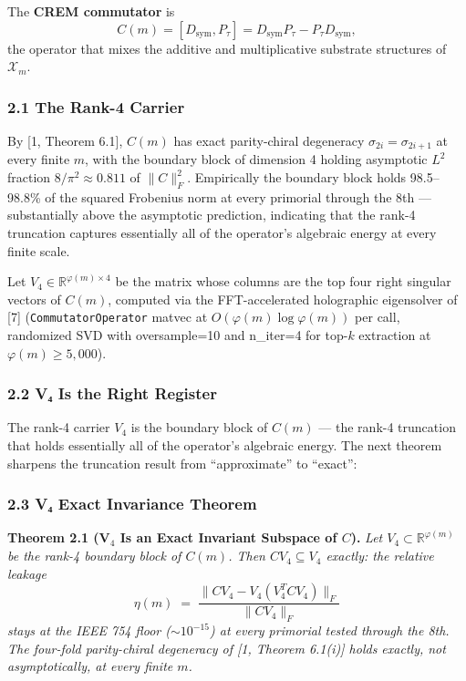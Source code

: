 \documentclass[
]{article}
\begin{document}
The \textbf{CREM commutator} is
\[C(m) = [D_\text{sym}, P_\tau] = D_\text{sym} P_\tau - P_\tau D_\text{sym}, \tag{2.1}\]
the operator that mixes the additive and multiplicative substrate
structures of \(\mathcal{X}_m\).

\subsubsection{2.1 The Rank-4 Carrier}\label{the-rank-4-carrier}

By {[}1, Theorem 6.1{]}, \(C(m)\) has exact parity-chiral degeneracy
\(\sigma_{2i} = \sigma_{2i+1}\) at every finite \(m\), with the boundary
block of dimension 4 holding asymptotic \(L^2\) fraction
\(8/\pi^2 \approx 0.811\) of \(\|C\|_F^2\). Empirically the boundary
block holds 98.5--98.8\% of the squared Frobenius norm at every
primorial through the 8th --- substantially above the asymptotic
prediction, indicating that the rank-4 truncation captures essentially
all of the operator's algebraic energy at every finite scale.

Let \(V_4 \in \mathbb{R}^{\varphi(m) \times 4}\) be the matrix whose
columns are the top four right singular vectors of \(C(m)\), computed
via the FFT-accelerated holographic eigensolver of {[}7{]}
(\texttt{CommutatorOperator} matvec at \(O(\varphi(m) \log \varphi(m))\)
per call, randomized SVD with oversample=10 and n\_iter=4 for top-\(k\)
extraction at \(\varphi(m) \geq 5{,}000\)).

\subsubsection{2.2 V₄ Is the Right
Register}\label{vux2084-is-the-right-register}

The rank-4 carrier \(V_4\) is the boundary block of \(C(m)\) --- the
rank-4 truncation that holds essentially all of the operator's algebraic
energy. The next theorem sharpens the truncation result from
``approximate'' to ``exact'':

\subsubsection{2.3 V₄ Exact Invariance
Theorem}\label{vux2084-exact-invariance-theorem}

\textbf{Theorem 2.1 (V\(_4\) Is an Exact Invariant Subspace of \(C\)).}
\emph{Let \(V_4 \subset \mathbb{R}^{\varphi(m)}\) be the rank-4 boundary
block of \(C(m)\). Then \(C V_4 \subseteq V_4\) exactly: the relative
leakage}
\[\eta(m) \;=\; \frac{\|CV_4 - V_4 (V_4^T C V_4)\|_F}{\|CV_4\|_F} \tag{2.2}\]
\emph{stays at the IEEE 754 floor (\(\sim 10^{-15}\)) at every primorial
tested through the 8th. The four-fold parity-chiral degeneracy of {[}1,
Theorem 6.1(i){]} holds exactly, not asymptotically, at every finite
\(m\).}
\end{document}
